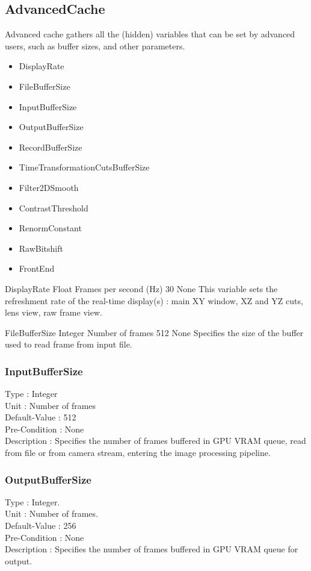 
\subsection{AdvancedCache}

Advanced cache gathers all the (hidden) variables that can be set by advanced users, such as buffer sizes, and other parameters.
\begin{itemize}
    \item DisplayRate
    \item FileBufferSize
    \item InputBufferSize
    \item OutputBufferSize
    \item RecordBufferSize
    \item TimeTransformationCutsBufferSize
    \item Filter2DSmooth
    \item ContrastThreshold
    \item RenormConstant
    \item RawBitshift
    \item FrontEnd
\end{itemize}

\entryparam
    {DisplayRate}
    {Float}
    {Frames per second (Hz)}
    {30}
    {None}
    {This variable sets the refreshment rate of the real-time display(s) : main XY window, XZ and YZ cuts, lens view, raw frame view.}

\entryparam
    {FileBufferSize}
    {Integer}
    {Number of frames}
    {512}
    {None}
    {Specifies the size of the buffer used to read frame from input file.}

\subsubsection{InputBufferSize}
\noindent
Type : Integer\\
Unit : Number of frames\\
Default-Value : 512\\
Pre-Condition :  None\\
Description : Specifies the number of frames buffered in GPU VRAM queue, read from file or from camera stream, entering the image processing pipeline.\\

\subsubsection{OutputBufferSize}
\noindent
Type : Integer.\\
Unit : Number of frames.\\
Default-Value : 256\\
Pre-Condition : None\\
Description : Specifies the number of frames buffered in GPU VRAM queue for output.\\

